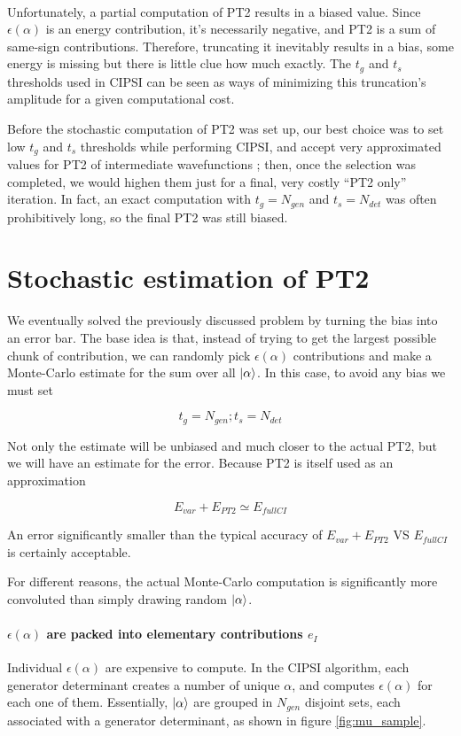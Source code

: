 \documentclass[./thesis.tex]{subfiles}
\begin{document}
\paragraph{}

Unfortunately, a partial computation of PT2 results in a biased value. Since $\epsilon(\alpha)$ is an energy contribution, it's necessarily negative, and PT2 is a sum of same-sign contributions. Therefore, truncating it inevitably results in a bias, some energy is missing but there is little clue how much exactly. The $t_g$ and $t_s$ thresholds used in CIPSI can be seen as ways of minimizing this truncation's amplitude for a given computational cost.

Before the stochastic computation of PT2 was set up, our best choice was to set low $t_g$ and $t_s$ thresholds while performing CIPSI, and accept very approximated values for PT2 of intermediate wavefunctions ; then, once the selection was completed, we would highen them just for a final, very costly ``PT2 only'' iteration. In fact, an exact computation with $t_g=N_{gen}$ and $t_s=N_{det}$ was often prohibitively long, so the final PT2 was still biased. 

\section{Stochastic estimation of PT2}

We eventually solved the previously discussed problem by turning the bias into an error bar. The base idea is that, instead of trying to get the largest possible chunk of contribution, we can randomly pick $\epsilon(\alpha)$ contributions and make a Monte-Carlo estimate for the sum over all $\ket \alpha$. In this case, to avoid any bias we must set

$$t_g = N_{gen} ; t_s = N_{det}$$

Not only the estimate will be unbiased and much closer to the actual PT2, but we will have an estimate for the error. Because PT2 is itself used as an approximation

$$E_{var} + E_{PT2} \simeq E_{fullCI}$$

An error significantly smaller than the typical accuracy of $E_{var} + E_{PT2}$ VS $E_{fullCI}$ is certainly acceptable.


For different reasons, the actual Monte-Carlo computation is significantly more convoluted than simply drawing random $\ket \alpha$. 

\paragraph{$\epsilon(\alpha)$ are packed into elementary contributions $e_I$}
Individual $\epsilon(\alpha)$ are expensive to compute. In the CIPSI algorithm, each generator determinant creates a number of unique $\alpha$, and computes $\epsilon(\alpha)$ for each one of them.
Essentially, $\ket \alpha$ are grouped in $N_{gen}$ disjoint sets, each associated with a generator determinant, as shown in figure \ref{fig:mu_sample}.
\end{document}

